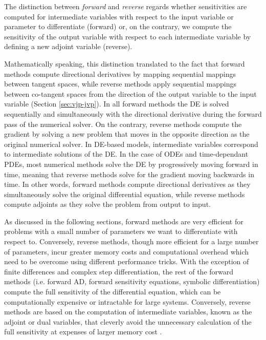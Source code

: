 The distinction between \textit{forward} and \textit{reverse} regards whether sensitivities are computed for intermediate variables with respect to the input variable or parameter to differentiate (forward) or, on the contrary, we compute the sensitivity of the output variable with respect to each intermediate variable by defining a new adjoint variable (reverse). 

Mathematically speaking, this distinction translated to the fact that forward methods compute directional derivatives by mapping sequential mappings between tangent spaces, while reverse methods apply sequential mappings between co-tangent spaces from the direction of the output variable to the input variable (Section \ref{sec:vjp-jvp}).   
In all forward methods the DE is solved sequentially and simultaneously with the directional derivative during the forward pass of the numerical solver. 
On the contrary, reverse methods compute the gradient by solving a new problem that moves in the opposite direction as the original numerical solver.
In DE-based models, intermediate variables correspond to intermediate solutions of the DE.
In the case of ODEs and time-dependant PDEs, most numerical methods solve the DE by progressively moving forward in time, meaning that reverse methods solve for the gradient moving backwards in time. 
In other words, forward methods compute directional derivatives as they simultaneously solve the original differential equation, while reverse methods compute adjoints as they solve the problem from output to input.

As discussed in the following sections, forward methods are very efficient for problems with a small number of parameters we want to differentiate with respect to. 
Conversely, reverse methods, though more efficient for a large number of parameters, incur greater memory costs and computational overhead which need to be overcome using different performance tricks. 
With the exception of finite differences and complex step differentiation, the rest of the forward methods (i.e. forward AD, forward sensitivity equations, symbolic differentiation) compute the full sensitivity of the differential equation, which can be computationally expensive or intractable for large systems. 
Conversely, reverse methods are based on the computation of intermediate variables, known as the adjoint or dual variables, that cleverly avoid the unnecessary calculation of the full sensitivity at expenses of larger memory cost \cite{Givoli_2021}. 

